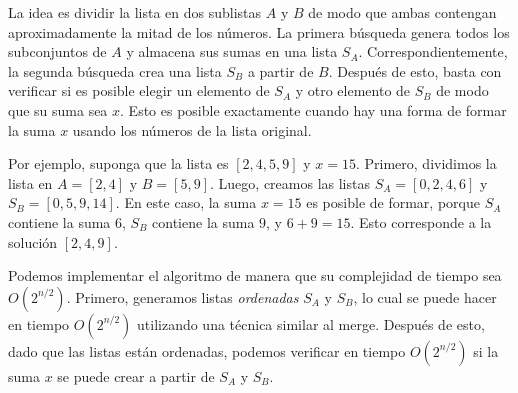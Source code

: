 La idea es dividir la lista en
dos sublistas $A$ y $B$ de modo que ambas
contengan aproximadamente la mitad de los números.
La primera búsqueda genera todos los subconjuntos
de $A$ y almacena sus sumas en una lista $S_A$.
Correspondientemente, la segunda búsqueda crea
una lista $S_B$ a partir de $B$.
Después de esto, basta con verificar si es posible
elegir un elemento de $S_A$ y otro
elemento de $S_B$ de modo que su suma sea $x$.
Esto es posible exactamente cuando hay una forma de
formar la suma $x$ usando los números de la lista original.

Por ejemplo, suponga que la lista es $[2,4,5,9]$ y $x=15$.
Primero, dividimos la lista en $A=[2,4]$ y $B=[5,9]$.
Luego, creamos las listas
$S_A=[0,2,4,6]$ y $S_B=[0,5,9,14]$.
En este caso, la suma $x=15$ es posible de formar,
porque $S_A$ contiene la suma $6$,
$S_B$ contiene la suma $9$, y $6+9=15$.
Esto corresponde a la solución $[2,4,9]$.

Podemos implementar el algoritmo de manera que
su complejidad de tiempo sea $O(2^{n/2})$.
Primero, generamos listas \emph{ordenadas} $S_A$ y $S_B$,
lo cual se puede hacer en tiempo $O(2^{n/2})$ utilizando una técnica similar al merge.
Después de esto, dado que las listas están ordenadas,
podemos verificar en tiempo $O(2^{n/2})$ si
la suma $x$ se puede crear a partir de $S_A$ y $S_B$.
